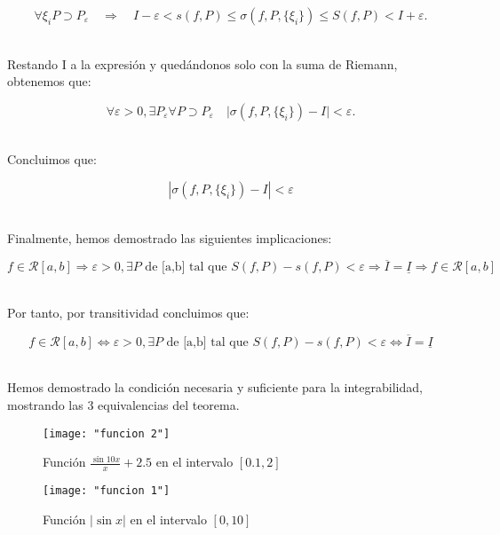 \documentclass[a4paper,12pt]{article}
\begin{document}
	
	
	\[
	\forall {\xi_i} \left. 
	 P\right.  \supset P_\varepsilon \quad \Rightarrow \quad I - \varepsilon < s(f, P) \leq \sigma(f, P, \{\xi_i\}) \leq S(f,P) < I + \varepsilon.
	\]
	
	\quad \\
	
	Restando I a la expresión y quedándonos solo con la suma de Riemann, obtenemos que:
	
	
	
	\[
	\forall \varepsilon > 0, \exists P_\varepsilon \left. \forall P \supset P_\varepsilon \right.  \quad \big| \sigma(f, P, \{\xi_i\}) - I \big| < \varepsilon.
	\]
	
	\quad \\
	
	Concluimos que:
	
	\[
	\left| \sigma(f, P, \{\xi_i\}) - I \right| < \varepsilon
	\]
	
	\quad \\
	
	Finalmente, hemos demostrado las siguientes implicaciones:
	
	\[
	f \in \mathcal{R}[a,b] \Rightarrow \varepsilon > 0, \exists P \text{ de [a,b] tal que }   S(f,P) - s(f,P) < \varepsilon \Rightarrow \overline{I} = \underline{I} \Rightarrow f \in \mathcal{R}[a,b] 
	\]
	
	\quad \\
	
	Por tanto, por transitividad concluimos que:
	
	\[
	f \in \mathcal{R}[a,b] \Longleftrightarrow \varepsilon > 0, \exists P \text{ de [a,b] tal que }   S(f,P) - s(f,P) < \varepsilon \Longleftrightarrow \overline{I} = \underline{I} 
	\]
	
	
	\quad \\

	
	Hemos demostrado la condición necesaria y suficiente para la integrabilidad, mostrando las 3 equivalencias del teorema.
	
	
	
	\clearpage 
\begin{figure}
	\centering 
	\caption{Función $ \frac{\sin 10x}{x} + 2.5 $ en el intervalo $ [0.1,2] $}
	\label{fig:funcion-2}
	\texttt{[image: "funcion 2"]}
\end{figure}

\begin{figure}
	\centering
	\caption{Función $ \left|\sin x\right| $ en el intervalo $ [0,10] $}
	\texttt{[image: "funcion 1"]}
	\label{fig:funcion-1}
\end{figure}
\end{document}

